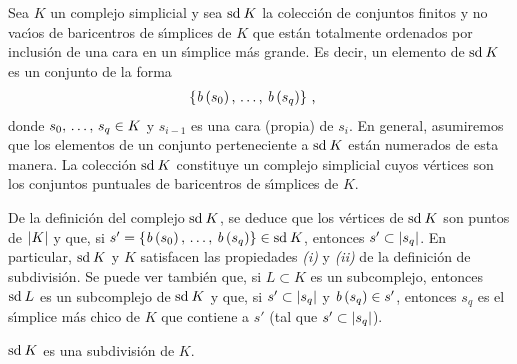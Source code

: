 Sea $K$ un complejo simplicial y sea $\mathrm{sd}^{}\,K$ la colecci\'{o}n de
conjuntos finitos y no vac\'{\i}os de baricentros de s\'{\i}mplices de $K$
que est\'{a}n totalmente ordenados por inclusi\'{o}n de una cara en un
s\'{\i}mplice m\'{a}s grande. Es decir, un elemento de $\mathrm{sd}^{}\,K$ es un
conjunto de la forma
\begin{align*}
	& \{\mathit{b}\left(s_{0}\right),\,\dots,\,\mathit{b}\left(s_{q}\right)\}
	\text{ ,}
\end{align*}
%
donde $\lista[0]{s}{q}\in K$ y $s_{i-1}$ es una cara (propia) de $s_{i}$.
En general, asumiremos que los elementos de un conjunto perteneciente a
$\mathrm{sd}^{}\,K$ est\'{a}n numerados de esta manera. La colecci\'{o}n $\mathrm{sd}^{}\,K$
constituye un complejo simplicial cuyos v\'{e}rtices son los conjuntos
puntuales de baricentros de s\'{\i}mplices de $K$.

De la definici\'{o}n del complejo $\mathrm{sd}^{}\,K$, se deduce que
los v\'{e}rtices de $\mathrm{sd}^{}\,K$ son puntos de $\left|K\right|$ y que,
si $s'=\{\mathit{b}\left(s_{0}\right),\,\dots,\,\mathit{b}\left(s_{q}\right)\}\in\mathrm{sd}^{}\,K$, entonces
$s'\subset\left|s_{q}\right|$. En particular, $\mathrm{sd}^{}\,K$ y $K$ satisfacen
las propiedades \emph{(i)} y \emph{(ii)} de la definici\'{o}n de
subdivisi\'{o}n. Se puede ver tambi\'{e}n que, si $L\subset K$ es un
subcomplejo, entonces $\mathrm{sd}^{}\,L$ es un subcomplejo de $\mathrm{sd}^{}\,K$ y que,
si $s'\subset\left|s_{q}\right|$ y $\mathit{b}\left(s_{q}\right)\in s'$, entonces $s_{q}$ es el
s\'{\i}mplice m\'{a}s chico de $K$ que contiene a $s'$ (tal que
$s'\subset\left|s_{q}\right|$).

\begin{propoBaricentricaEsSubdivision}\label{thm:baricentricaessubdivision}
	$\mathrm{sd}^{}\,K$ es una subdivisi\'{o}n de $K$.
\end{propoBaricentricaEsSubdivision}

